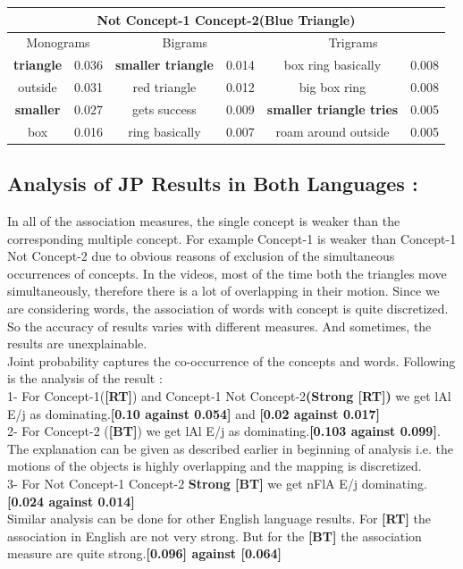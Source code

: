 \def\DevnagVersion{2.15}\documentclass[a4paper, 11pt, notitlepage]{report}
\begin{document}
\begin{center}

\begin{tabular}{||c|l||c|l||c|l||}
\hline
\multicolumn{6}{||c||}{\bf Not Concept-1 Concept-2(Blue Triangle) }\\
\hline
\multicolumn{2}{||c||}{Monograms } &\multicolumn{2}{|c||}{Bigrams} &\multicolumn{2}{|c||}{Trigrams} \\
\hline
{\bf triangle} & 0.036 & {\bf smaller triangle} & 0.014 & box ring basically & 0.008\\
outside & 0.031 & red triangle & 0.012 &big box ring & 0.008\\
{\bf smaller} & 0.027 & gets success & 0.009 &{\bf smaller triangle tries} & 0.005\\
box &0.016 & ring basically & 0.007 & roam around outside & 0.005\\
\hline
\end{tabular}
\end{center}

\subsection{Analysis of JP Results in Both Languages :}
In all of the association measures, the single concept is weaker than the corresponding multiple concept. For example Concept-1 is weaker than Concept-1 Not Concept-2 due to obvious reasons of exclusion of the simultaneous occurrences of concepts. In the videos, most of the time both the triangles move simultaneously, therefore there is a lot of overlapping in their motion. Since we are considering words, the association of words with concept is quite discretized. So the accuracy of results varies with different measures. And sometimes, the results are unexplainable.\\

Joint probability captures the co-occurrence of the concepts and words. Following is the analysis of the result :\\
1- For  Concept-1({\bf [RT]}) and Concept-1 Not Concept-2{\bf(Strong [RT])} we get {\dn lAl E/j} as dominating.{\bf [0.10 against 0.054]} and {\bf [0.02 against 0.017]}\\
2- For Concept-2 ({\bf [BT]}) we get {\dn lAl E/j} as dominating.{\bf [0.103 against 0.099]}. The explanation can be given as described earlier in beginning of analysis i.e. the motions of the objects is highly overlapping and the mapping is discretized.\\
3- For Not Concept-1 Concept-2 {\bf Strong [BT]} we get {\dn nFlA E/j} dominating.{\bf [0.024 against 0.014]}\\  
Similar analysis can be done for other English language results. For {\bf [RT]} the association in English are not very strong. But for the {\bf [BT]} the association measure are quite strong.{\bf [0.096] against [0.064]}\\
\end{document}
